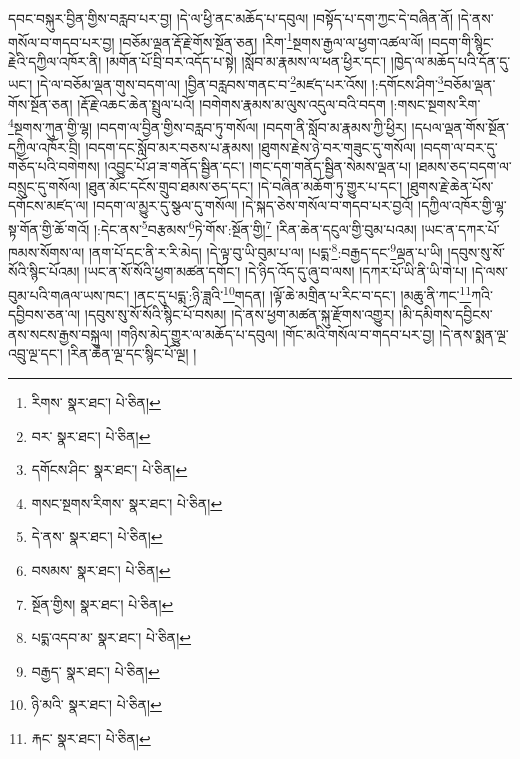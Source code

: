 དབང་བསྐུར་བྱིན་གྱིས་བརླབ་པར་བྱ། །དེ་ལ་ཕྱི་ནང་མཆོད་པ་དབུལ། །བསྟོད་པ་དག་ཀྱང་དེ་བཞིན་ནོ། །དེ་ནས་གསོལ་བ་གདབ་པར་བྱ། །བཅོམ་ལྡན་རྡོ་རྗེ་གོས་སྔོན་ཅན། །རིག་\footnote{རིགས་  སྣར་ཐང་།  པེ་ཅིན། }སྔགས་རྒྱལ་ལ་ཕྱག་འཚལ་ལོ། །བདག་གི་སྙིང་རྗེའི་དཀྱིལ་འཁོར་ནི། །མགོན་པོ་བྲི་བར་འདོད་པ་སྟེ། །སློབ་མ་རྣམས་ལ་ཕན་ཕྱིར་དང་། །ཁྱེད་ལ་མཆོད་པའི་དོན་དུ་ཡང་། །དེ་ལ་བཅོམ་ལྡན་གུས་བདག་ལ། །བྱིན་བརླབས་གནང་བ་\footnote{བར་  སྣར་ཐང་།  པེ་ཅིན། }མཛད་པར་འོས། །:དགོངས་ཤིག་\footnote{དགོངས་ཤིང་  སྣར་ཐང་།  པེ་ཅིན། }བཅོམ་ལྡན་གོས་སྔོན་ཅན། །རྡོ་རྗེ་འཆང་ཆེན་སྤྲུལ་པའོ། །བགེགས་རྣམས་མ་ལུས་འདུལ་བའི་བདག །:གསང་སྔགས་རིག་\footnote{གསང་སྔགས་རིགས་  སྣར་ཐང་།  པེ་ཅིན། }སྔགས་ཀུན་གྱི་ལྷ། །བདག་ལ་བྱིན་གྱིས་བརླབ་ཏུ་གསོལ། །བདག་ནི་སློབ་མ་རྣམས་ཀྱི་ཕྱིར། །དཔལ་ལྡན་གོས་སྔོན་དཀྱིལ་འཁོར་བྲི། །བདག་དང་སློབ་མར་བཅས་པ་རྣམས། །ཐུགས་རྗེས་ཉེ་བར་གཟུང་དུ་གསོལ། །བདག་ལ་བར་དུ་གཅོད་པའི་བགེགས། །འབྱུང་པོ་ཤ་ཟ་གནོད་སྦྱིན་དང་། །གང་དག་གནོད་སྦྱིན་སེམས་ལྡན་པ། །ཐམས་ཅད་བདག་ལ་བསྲུང་དུ་གསོལ། །ཐུན་མོང་དངོས་གྲུབ་ཐམས་ཅད་དང་། །དེ་བཞིན་མཆོག་ཏུ་གྱུར་པ་དང་། །ཐུགས་རྗེ་ཆེན་པོས་དགོངས་མཛད་ལ། །བདག་ལ་མྱུར་དུ་སྩལ་དུ་གསོལ། །དེ་སྐད་ཅེས་གསོལ་བ་གདབ་པར་བྱའོ། །དཀྱིལ་འཁོར་གྱི་ལྷ་སྟ་གོན་གྱི་ཆོ་གའོ། །:དེང་ནས་\footnote{དེ་ནས་  སྣར་ཐང་།  པེ་ཅིན། }བརྩམས་\footnote{བསམས་  སྣར་ཐང་།  པེ་ཅིན། }ཏེ་གོས་:སྔོན་གྱི།\footnote{སྔོན་གྱིས།  སྣར་ཐང་།  པེ་ཅིན། } །རིན་ཆེན་དངུལ་གྱི་བུམ་པའམ། །ཡང་ན་དཀར་པོ་ཁམས་སོགས་ལ། །ནག་པོ་དང་ནི་ར་རི་མེད། །དེ་ལྟ་བུ་ཡི་བུམ་པ་ལ། །པདྨ་\footnote{པདྨ་འདབ་མ་  སྣར་ཐང་།  པེ་ཅིན། }:བརྒྱད་དང་\footnote{བརྒྱད་  སྣར་ཐང་།  པེ་ཅིན། }ལྡན་པ་ཡི། །དབུས་སུ་སོ་སོའི་སྙིང་པོའམ། །ཡང་ན་སོ་སོའི་ཕྱག་མཚན་དགོང་། །དེ་ཉིད་འོད་དུ་ཞུ་བ་ལས། །དཀར་པོ་ཡི་ནི་ཡི་གེ་པ། །དེ་ལས་བུམ་པའི་གཞལ་ཡས་ཁང་། །ནང་དུ་པདྨ་:ཉི་ཟླའི་\footnote{ཉི་མའི་  སྣར་ཐང་།  པེ་ཅིན། }གདན། །ལྟོ་ཆེ་མགྲིན་པ་རིང་བ་དང་། །མཆུ་ནི་ཀང་\footnote{རྐང་  སྣར་ཐང་།  པེ་ཅིན། }ཀའི་དབྱིབས་ཅན་ལ། །དབུས་སུ་སོ་སོའི་སྙིང་པོ་བསམ། །དེ་ནས་ཕྱག་མཚན་སྐུ་རྫོགས་འགྱུར། །མི་དམིགས་དབྱིངས་ནས་སངས་རྒྱས་བསྐུལ། །གཉིས་མེད་གྱུར་ལ་མཆོད་པ་དབུལ། །གོང་མའི་གསོལ་བ་གདབ་པར་བྱ། །དེ་ནས་སྨན་ལྔ་འབྲུ་ལྔ་དང་། །རིན་ཆེན་ལྔ་དང་སྙིང་པོ་ལྔ། །
